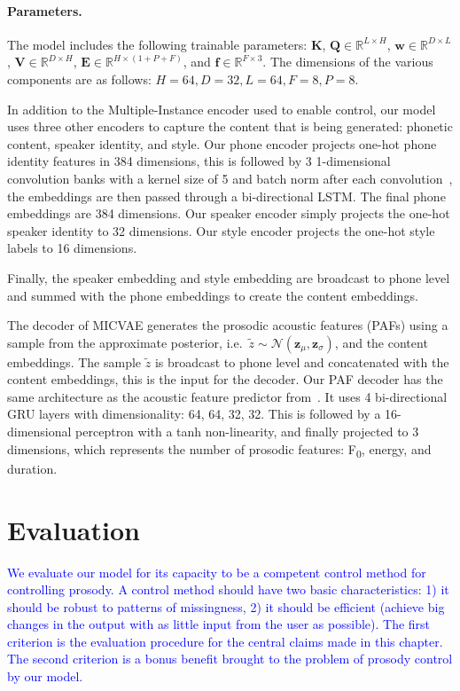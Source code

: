 \documentclass[a4paper,12pt,twoside,openright]{article}
\newcommand{\draft}[1]{\textcolor{blue}{#1}}
\newcommand{\fzero}{F\textsubscript{0}}
\begin{document}
\paragraph{Parameters.} The model includes the following trainable parameters: $\mathbf{K}$, $\mathbf{Q} \in \mathbb{R}^{L \times H}$, $\mathbf{w} \in \mathbb{R}^{D \times L}$, $\mathbf{V} \in \mathbb{R}^{D \times H}$, $\mathbf{E} \in \mathbb{R}^{H \times (1+P+F)}$, and $\mathbf{f} \in \mathbb{R}^{F \times 3}$. The dimensions of the various components are as follows: \( H = 64, D = 32, L = 64, F = 8, P = 8 \).

In addition to the Multiple-Instance encoder used to enable control, our model uses three other encoders to capture the content that is being generated: phonetic content, speaker identity, and style. Our phone encoder projects one-hot phone identity features in 384 dimensions, this is followed by 3 1-dimensional convolution banks with a kernel size of 5 and batch norm after each convolution~\parencite{batch-normalisation:2015}, the embeddings are then passed through a bi-directional LSTM. The final phone embeddings are 384 dimensions. Our speaker encoder simply projects the one-hot speaker identity to 32 dimensions. Our style encoder projects the one-hot style labels to 16 dimensions. 

Finally, the speaker embedding and style embedding are broadcast to phone level and summed with the phone embeddings to create the content embeddings.

The decoder of MICVAE generates the prosodic acoustic features (PAFs) using a sample from the approximate posterior, i.e.\ $\tilde{z} \sim \mathcal{N}(\mathbf{z}_\mu, \mathbf{z}_\sigma)$, and the content embeddings. The sample $\tilde{z}$ is broadcast to phone level and concatenated with the content embeddings, this is the input for the decoder. Our PAF decoder has the same architecture as the acoustic feature predictor from~\parencite{PaperCup-Ctrl-P:2021}. It uses 4 bi-directional GRU layers with dimensionality: 64, 64, 32, 32. This is followed by a 16-dimensional perceptron with a tanh non-linearity, and finally projected to 3 dimensions, which represents the number of prosodic features: \fzero, energy, and duration.

\section{Evaluation}

\draft{We evaluate our model for its capacity to be a competent control method for controlling prosody. A control method should have two basic characteristics: 1) it should be robust to patterns of missingness, 2) it should be efficient (achieve big changes in the output with as little input from the user as possible). The first criterion is the evaluation procedure for the central claims made in this chapter. The second criterion is a bonus benefit brought to the problem of prosody control by our model.}
\end{document}
